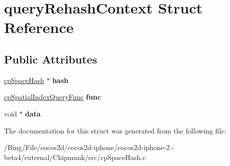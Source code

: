\hypertarget{structquery_rehash_context}{\section{query\-Rehash\-Context Struct Reference}
\label{structquery_rehash_context}
}
\subsection*{Public Attributes}
\begin{DoxyCompactItemize}
\item 
\hypertarget{structquery_rehash_context_ac898adfa2a2cd6521785e05b99663579}{\hyperlink{structcp_space_hash}{cp\-Space\-Hash} $\ast$ {\bfseries hash}}\label{structquery_rehash_context_ac898adfa2a2cd6521785e05b99663579}

\item 
\hypertarget{structquery_rehash_context_a4f7c1d71e77bdc1ccf00d28e88a3a1cb}{\hyperlink{group__cp_spatial_index_ga4885d6b7a5f9f613a19a25e1c7ec5073}{cp\-Spatial\-Index\-Query\-Func} {\bfseries func}}\label{structquery_rehash_context_a4f7c1d71e77bdc1ccf00d28e88a3a1cb}

\item 
\hypertarget{structquery_rehash_context_a2ff72eb7157b40ba88e8ebcae93e9207}{void $\ast$ {\bfseries data}}\label{structquery_rehash_context_a2ff72eb7157b40ba88e8ebcae93e9207}

\end{DoxyCompactItemize}


The documentation for this struct was generated from the following file\-:\begin{DoxyCompactItemize}
\item 
/\-Bing/\-File/cocos2d/cocos2d-\/iphone/cocos2d-\/iphone-\/2.-\/beta4/external/\-Chipmunk/src/cp\-Space\-Hash.\-c\end{DoxyCompactItemize}
